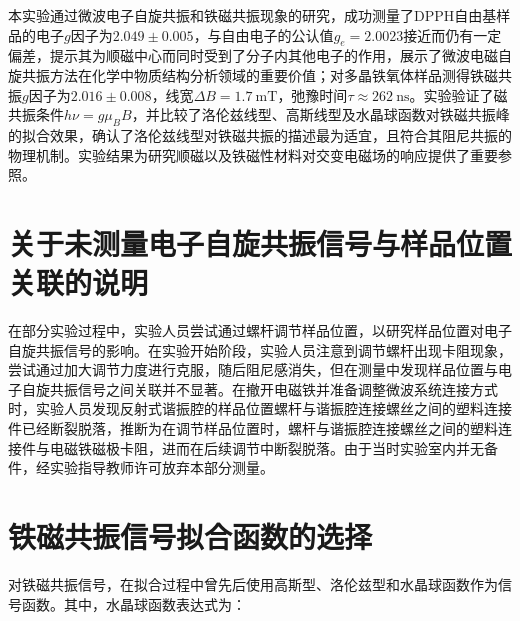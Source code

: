\documentclass{thuemp}
\begin{document}
    本实验通过微波电子自旋共振和铁磁共振现象的研究，成功测量了DPPH自由基样品的电子$g$因子为$2.049 \pm 0.005$，与自由电子的公认值$g_e=2.0023$接近而仍有一定偏差，提示其为顺磁中心而同时受到了分子内其他电子的作用，展示了微波电磁自旋共振方法在化学中物质结构分析领域的重要价值；对多晶铁氧体样品测得铁磁共振$g$因子为$2.016 \pm 0.008$，线宽$\Delta B = \SI{1.7}{\milli\tesla}$，弛豫时间$\tau \approx \SI{262}{\nano\second}$。实验验证了磁共振条件$h\nu = g\mu_B B$，并比较了洛伦兹线型、高斯线型及水晶球函数对铁磁共振峰的拟合效果，确认了洛伦兹线型对铁磁共振的描述最为适宜，且符合其阻尼共振的物理机制。实验结果为研究顺磁以及铁磁性材料对交变电磁场的响应提供了重要参照。
    
    
    
    \renewcommand\refname{\heiti\wuhao\centerline{参考文献}\global\def\refname{参考文献}}
    \vskip 12pt
    
    \let\OLDthebibliography\thebibliography
    \renewcommand\thebibliography[1]{
      \OLDthebibliography{#1}
      \setlength{\parskip}{0pt}
      \setlength{\itemsep}{0pt plus 0.3ex}
    }
    
    {
    \renewcommand{\baselinestretch}{0.9}
    \liuhao
    

}
\newpage
\appendix

\section{关于未测量电子自旋共振信号与样品位置关联的说明}

在部分实验过程中，实验人员尝试通过螺杆调节样品位置，以研究样品位置对电子自旋共振信号的影响。在实验开始阶段，实验人员注意到调节螺杆出现卡阻现象，尝试通过加大调节力度进行克服，随后阻尼感消失，但在测量中发现样品位置与电子自旋共振信号之间关联并不显著。在撤开电磁铁并准备调整微波系统连接方式时，实验人员发现反射式谐振腔的样品位置螺杆与谐振腔连接螺丝之间的塑料连接件已经断裂脱落，推断为在调节样品位置时，螺杆与谐振腔连接螺丝之间的塑料连接件与电磁铁磁极卡阻，进而在后续调节中断裂脱落。由于当时实验室内并无备件，经实验指导教师许可放弃本部分测量。

\section{铁磁共振信号拟合函数的选择}

对铁磁共振信号，在拟合过程中曾先后使用高斯型、洛伦兹型和水晶球函数作为信号函数。其中，水晶球函数表达式为：
\end{document}
